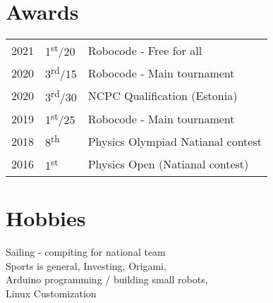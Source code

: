 \documentclass[letterpaper]{deedy-resume} %
\begin{document}
\begin{minipage}[t]{0.66\textwidth}

\section{Awards} 

\begin{tabular}{rll}
2021	 & 1\textsuperscript{st}/20 & Robocode - Free for all \\
2020	 & 3\textsuperscript{rd}/15 & Robocode - Main tournament \\
2020     & 3\textsuperscript{rd}/30 & NCPC Qualification (Estonia) \\
2019     & 1\textsuperscript{st}/25 & Robocode - Main tournament \\
2018 & 8\textsuperscript{th} & Physics Olympiad Natianal contest \\
2016 & 1\textsuperscript{st} & Physics Open (Natianal contest) \\
\end{tabular}

\sectionspace %


\section{Hobbies} 

Sailing - compiting for national team \\ 
Sports is general, Investing, Origami, \\
Arduino programming / building small robots, \\
Linux Customization \\

\sectionspace %


\end{minipage} %


\end{document}

